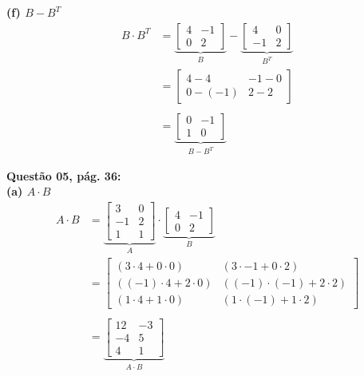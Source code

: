 \documentclass[a4paper,12pt]{article}
\begin{document}
\textbf{(f) $B - B^{T}$}
\begin{align*}
B \cdot B^{T}&=
    \underbrace{
    \begin{bmatrix}
        4 & -1\\
        0 & 2
    \end{bmatrix}}_{B} 
    -
    \underbrace{
    \begin{bmatrix}
        4 & 0\\
        -1 & 2
    \end{bmatrix}}_{B^{T}} \\
    &=
    \begin{bmatrix}
        4 - 4 & -1 - 0\\
        0 - (-1) & 2 - 2
    \end{bmatrix} \\ \\
    &=
    \underbrace{
    \begin{bmatrix}
        0 & -1\\
        1 & 0
    \end{bmatrix}}_{B - B^{T}} 
\end{align*}

\textbf{Questão 05, pág. 36:}\\

\textbf{(a) $A \cdot B$}
\begin{align*}
A \cdot B&=
    \underbrace{
    \begin{bmatrix}
        3 & 0\\
        -1 & 2\\
        1 & 1
    \end{bmatrix}}_{A} 
    \cdot
    \underbrace{
    \begin{bmatrix}
        4 & -1\\
        0 & 2
    \end{bmatrix}}_{B} \\
    &=
    \begin{bmatrix}
        (3\cdot 4 + 0 \cdot 0) & (3 \cdot -1 + 0 \cdot 2)\\
        ((-1) \cdot 4 + 2 \cdot 0) & ((-1) \cdot (-1) + 2 \cdot 2)\\
        (1 \cdot 4 + 1 \cdot 0) & (1 \cdot (-1) + 1 \cdot 2)
    \end{bmatrix} \\ \\
    &=
    \underbrace{
    \begin{bmatrix}
        12 & -3\\
        -4 & 5 \\
        4 & 1
    \end{bmatrix}}_{A \cdot B} 
\end{align*}
\end{document}
